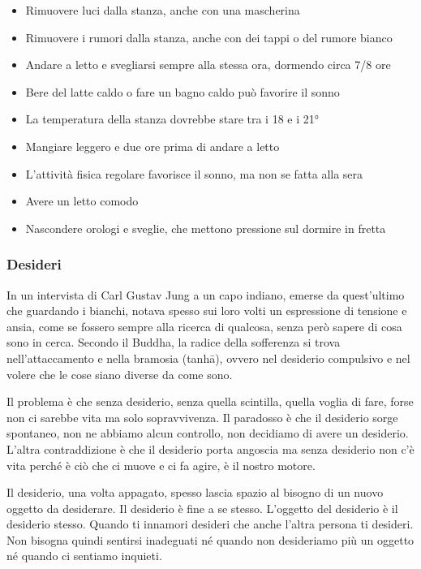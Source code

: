 \documentclass[12pt]{book} %
\begin{document}
\begin{mdframed}[linewidth=1pt]
\begin{itemize}
\item Rimuovere luci dalla stanza, anche con una mascherina
\item Rimuovere i rumori dalla stanza, anche con dei tappi o del rumore bianco
\item Andare a letto e svegliarsi sempre alla stessa ora, dormendo circa 7/8 ore
\item Bere del latte caldo o fare un bagno caldo può favorire il sonno
\item La temperatura della stanza dovrebbe stare tra i 18 e i 21°
\item Mangiare leggero e due ore prima di andare a letto
\item L'attività fisica regolare favorisce il sonno, ma non se fatta alla sera
\item Avere un letto comodo 
\item Nascondere orologi e sveglie, che mettono pressione sul dormire in fretta
\end{itemize}
\end{mdframed}

\subsubsection{Desideri}
In un intervista di Carl Gustav Jung a un capo indiano, emerse da quest'ultimo che guardando i
bianchi, notava spesso sui loro volti un espressione di tensione e ansia, come se fossero sempre alla ricerca di
qualcosa, senza però sapere di cosa sono in cerca. Secondo il Buddha, la radice della sofferenza si trova nell’attaccamento e nella bramosia (tanhā), ovvero nel desiderio compulsivo e nel volere che le cose siano diverse da come sono.

Il problema è che senza desiderio, senza quella scintilla, quella voglia di fare, forse non ci sarebbe vita ma solo
sopravvivenza. Il paradosso è che il desiderio sorge spontaneo, non ne abbiamo alcun controllo, non decidiamo di avere
un desiderio. L'altra contraddizione è che il desiderio porta angoscia ma senza desiderio non c'è vita perché è ciò che
ci muove e ci fa agire, è il nostro motore. 

Il desiderio, una volta appagato, spesso lascia spazio al bisogno di un nuovo oggetto da desiderare. Il desiderio è fine a se stesso.
L'oggetto del desiderio è il desiderio stesso. Quando ti innamori desideri che anche
l'altra persona ti desideri. Non bisogna quindi sentirsi inadeguati né quando non desideriamo più
un oggetto né quando ci sentiamo inquieti.
\end{document}
